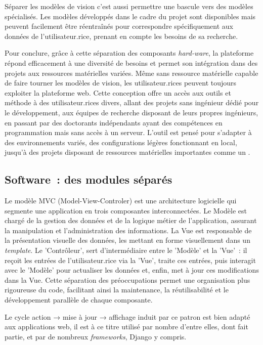Séparer les modèles de vision c'est aussi permettre une bascule vers des
modèles spécialisés. Les modèles développés dans le cadre du projet sont
disponibles mais peuvent facilement être réentraînés pour correspondre
spécifiquement aux données de l'utilisateur.rice, prenant en compte les
besoins de sa recherche.

Pour conclure, grâce à cette séparation des composants \textit{hard-ware}, la
plateforme répond efficacement à une diversité de besoins et permet son
intégration dans des projets aux ressources matérielles variées. Même
sans ressource matérielle capable de faire tourner les modèles de
vision, les utilisateur.rices peuvent toujours exploiter la plateforme web.
Cette conception offre un accès aux outils et méthode à des utilisateur.rices
divers, allant des projets sans ingénieur dédié pour le
développement, aux équipes de recherche disposant de leurs propres
ingénieurs, en passant par des doctorants indépendants ayant des
compétences en programmation mais sans accès à un serveur. L'outil est
pensé pour s'adapter à des environnements variés, des configurations
légères fonctionnant en local, jusqu'à des projets disposant de
ressources matérielles importantes comme un \gpu.

\hypertarget{software-des-modules-separes}{%
\subsection{Software~: des modules
séparés}\label{software-des-modules-separes}}

Le modèle MVC (Model-View-Controler) est une architecture logicielle qui
segmente une application en trois composantes interconnectées. Le Modèle
est chargé de la gestion des données et de la logique métier de
l'application, assurant la manipulation et l'administration des
informations. La Vue est responsable de la présentation visuelle des
données, les mettant en forme visuellement dans un \textit{template}. Le
'Contrôleur', sert d'intermédiaire entre le 'Modèle' et la 'Vue'~: il reçoit
les entrées de l'utilisateur.rice via la 'Vue', traite ces entrées, puis
interagit avec le 'Modèle' pour actualiser les données et, enfin, met à
jour ces modifications dans la Vue. Cette séparation des préoccupations
permet une organisation plus rigoureuse du code, facilitant ainsi la
maintenance, la réutilisabilité et le développement parallèle de chaque
composante.

Le cycle action → mise à jour → affichage induit par ce patron est bien
adapté aux applications web, il est à ce titre utilisé par nombre
d'entre elles, dont \eida fait partie, et par de nombreux \textit{frameworks},
Django y compris.

